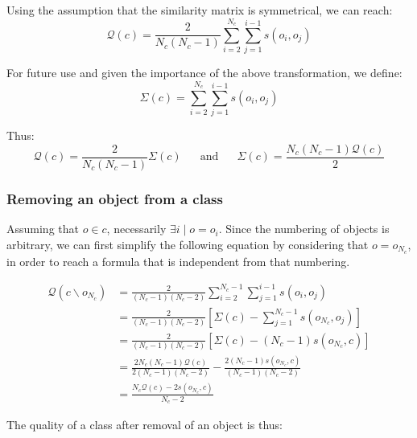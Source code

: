 \documentclass[natbib,smallextended]{svjour3}
\begin{document}
Using the assumption that the similarity matrix is symmetrical, we can reach: %
\begin{equation}
    \mathcal{Q}\left(c\right) = \frac{2}{N_c(N_c-1)} \sum_{i=2}^{N_c} \sum_{j=1}^{i-1} s\left(o_i, o_j\right)
    \label{eq:classQuality}
\end{equation}

For future use and given the importance of the above transformation, we define:
\[
  \Sigma(c) = \sum_{i=2}^{N_c} \sum_{j=1}^{i-1} s\left(o_i, o_j\right)
\]

Thus:
\[
\mathcal{Q}\left(c\right) = \frac{2}{N_c(N_c-1)}\Sigma(c) \phantom{XX}\mathrm{and}\phantom{XX} \Sigma(c) = \frac{N_c(N_c-1)\mathcal{Q}\left(c\right)}{2}
\]

\subsubsection{Removing an object from a class}

Assuming that $o \in c$, necessarily $\exists i \mid o=o_i$. Since the numbering of objects is arbitrary, we can first simplify the following equation by considering that $o = o_{N_c}$, in order to reach a formula that is independent from that numbering.

\begin{equation*}
  \begin{aligned}
    \mathcal{Q}\left(c \smallsetminus o_{N_c}\right) & = \frac{2}{(N_c-1)(N_c-2)} \sum_{i=2}^{N_c-1} \sum_{j=1}^{i-1} s\left(o_i, o_j\right) \\
                                                   & = \frac{2}{(N_c-1)(N_c-2)} \left[\Sigma(c) - \sum_{j=1}^{N_c-1} s\left(o_{N_c}, o_j\right) \right] \\
                                                   & = \frac{2}{(N_c-1)(N_c-2)} \left[\Sigma(c) - (N_c-1)s\left(o_{N_c}, c\right) \right] \\
                                                   & = \frac{2N_c(N_c-1)\mathcal{Q}(c)}{2(N_c-1)(N_c-2)} - \frac{2(N_c-1)s\left(o_{N_c}, c\right)}{(N_c-1)(N_c-2)}\\
                                                   & = \frac{N_c \mathcal{Q}(c)  - 2s\left(o_{N_c}, c\right)}{N_c-2}
  \end{aligned}
\end{equation*}

The quality of a class after removal of an object is thus:
\end{document}
